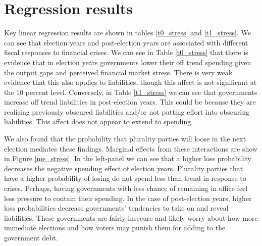 \documentclass[]{article}
\begin{document}
\section{Regression results}

Key linear regression results are shown in tables \ref{t0_stress} and \ref{t1_stress}. We can see that election years and post-election years are associated with different fiscal responses to financial crises. We can see in Table \ref{t0_stress} that there is evidence that in election years governments lower their off trend spending given the output gaps and perceived financial market stress. There is very weak evidence that this also applies to liabilities, though this affect is not significant at the 10 percent level. Conversely, in Table \ref{t1_stress} we can see that governments increase off trend liabilities in post-election years. This could be because they are realising previously obscured liabilities and/or not putting effort into obscuring liabilities. This affect does not appear to extend to spending.

We also found that the probability that plurality parties will loose in the next election mediates these findings. Marginal effects from these interactions are show in Figure \ref{me_stress}. In the left-panel we can see that a higher loss probability decreases the negative spending effect of election years. Plurality parties that have a higher probability of losing do not spend less than trend in response to crises. Perhaps, having governments with less chance of remaining in office feel less pressure to contain their spending. In the case of post-election years, higher loss probabilities decrease governments' tendencies to take on and reveal liabilities. These governments are fairly insecure and likely worry about how more immediate elections and how voters may punish them for adding to the government debt.
\end{document}
